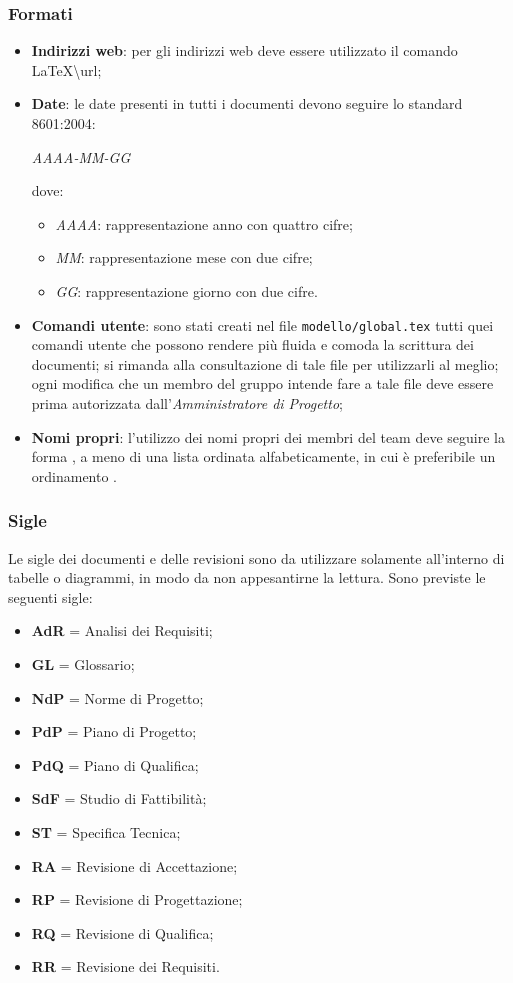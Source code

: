 \subsubsection{Formati}
\begin{itemize}
\item \textbf{Indirizzi web}: per gli indirizzi web deve essere utilizzato il comando \LaTeX \textbackslash{url};
\item \textbf{Date}: le date presenti in tutti i documenti devono seguire lo standard  8601:2004: 
\begin{center}
\textit{AAAA-MM-GG}
\end{center}
dove:
\begin{itemize}
\item \textit{AAAA}: rappresentazione anno con quattro cifre;
\item \textit{MM}: rappresentazione mese con due cifre;
\item \textit{GG}: rappresentazione giorno con due cifre.
\end{itemize}
\item \textbf{Comandi utente}: sono stati creati nel file \texttt{modello/global.tex} tutti quei comandi utente che possono rendere più fluida e comoda la scrittura dei documenti; si rimanda alla consultazione di tale file per utilizzarli al meglio; ogni modifica che un membro del gruppo intende fare a tale file deve essere prima autorizzata dall'\textit{Amministratore di Progetto};
\item \textbf{Nomi propri}: l'utilizzo dei nomi propri dei membri del team deve seguire la forma , a meno di una lista ordinata alfabeticamente, in cui è preferibile un ordinamento .
\end{itemize}

\subsubsection{Sigle}

Le sigle dei documenti e delle revisioni sono da utilizzare solamente all'interno di tabelle o diagrammi, in modo da non appesantirne la lettura. Sono previste le seguenti sigle:

\begin{itemize}
\item \textbf{AdR} = Analisi dei Requisiti;
\item \textbf{GL} = Glossario;
\item \textbf{NdP} = Norme di Progetto;
\item \textbf{PdP} = Piano di Progetto;
\item \textbf{PdQ} = Piano di Qualifica;
\item \textbf{SdF} = Studio di Fattibilità;
\item \textbf{ST} = Specifica Tecnica;
\item \textbf{RA} = Revisione di Accettazione;
\item \textbf{RP} = Revisione di Progettazione;
\item \textbf{RQ} = Revisione di Qualifica;
\item \textbf{RR} = Revisione dei Requisiti.
\end{itemize}

